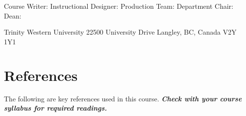 \documentclass[
]{book}
\begin{document}
Course Writer:
Instructional Designer:
Production Team:
Department Chair:
Dean:

Trinity Western University
22500 University Drive
Langley, BC, Canada \textbar{} V2Y 1Y1

\hypertarget{references}{%
\chapter*{References}\label{references}}

The following are key references used in this course. \textbf{\emph{Check with your course syllabus for required readings.}}

  
\end{document}
